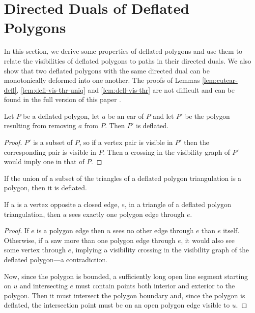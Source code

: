 \documentclass{patmorin}
\begin{document}

\section{Directed Duals of Deflated Polygons}

In this section, we derive some properties of deflated polygons and
use them to relate the visibilities of deflated polygons to paths in
their directed duals.  We also show that two deflated polygons with
the same directed dual can be monotonically deformed into one another.
\ifconferenceversion The proofs of Lemmas \ref{lem:cutear-defl},
\ref{lem:defl-vis-thr-uniq} and \ref{lem:defl-vis-thr} are not
difficult and can be found in the full version of this
paper \cite{Bose12}. \fi

\begin{lemma}
  \label{lem:cutear-defl}
  Let $P$ be a deflated polygon, let $a$ be an ear of $P$ and let $P'$
  be the polygon resulting from removing $a$ from $P$.  Then $P'$ is
  deflated.
\end{lemma}
\iffullversion
\begin{proof}
  $P'$ is a subset of $P$, so if a vertex pair is visible in $P'$ then
  the corresponding pair is visible in $P$.  Then a crossing in the
  visibility graph of $P'$ would imply one in that of $P$.
\end{proof}
\fi

\begin{cor}
  \label{cor:subpoly-defl}
  If the union of a subset of the triangles of a deflated polygon
  triangulation is a polygon, then it is deflated.
\end{cor}

\begin{lemma}
  \label{lem:defl-vis-thr-uniq}
  If $u$ is a vertex opposite a closed edge, $e$, in a triangle of a
  deflated polygon triangulation, then $u$ sees exactly one polygon
  edge through $e$.
\end{lemma}
\iffullversion
\begin{proof}
  If $e$ is a polygon edge then $u$ sees no other edge through $e$
  than $e$ itself.  Otherwise, if $u$ saw more than one polygon edge
  through $e$, it would also see some vertex through $e$, implying a
  visibility crossing in the visibility graph of the deflated
  polygon---a contradiction.
  
  Now, since the polygon is bounded, a sufficiently long open line
  segment starting on $u$ and intersecting $e$ must contain points
  both interior and exterior to the polygon.  Then it must intersect
  the polygon boundary and, since the polygon is deflated, the
  intersection point must be on an open polygon edge visible to $u$.
\end{proof}
\fi
\end{document}
